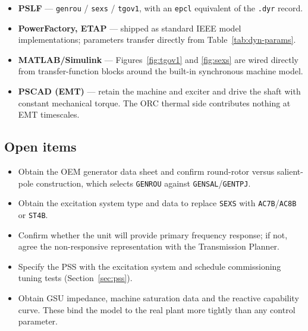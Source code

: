 \begin{itemize}\setlength{\itemsep}{0.25em}
  \item \textbf{PSLF} --- \texttt{genrou} / \texttt{sexs} / \texttt{tgov1},
        with an \texttt{epcl} equivalent of the \texttt{.dyr} record.
  \item \textbf{PowerFactory, ETAP} --- shipped as standard IEEE model
        implementations; parameters transfer directly from
        Table~\ref{tab:dyn-params}.
  \item \textbf{MATLAB/Simulink} --- Figures~\ref{fig:tgov1} and
        \ref{fig:sexs} are wired directly from transfer-function blocks around
        the built-in synchronous machine model.
  \item \textbf{PSCAD (EMT)} --- retain the machine and exciter and drive the
        shaft with constant mechanical torque. The ORC thermal side contributes
        nothing at EMT timescales.
\end{itemize}

\subsection{Open items}
\begin{itemize}\setlength{\itemsep}{0.25em}
  \item Obtain the OEM generator data sheet and confirm round-rotor versus
        salient-pole construction, which selects \texttt{GENROU} against
        \texttt{GENSAL}/\texttt{GENTPJ}.
  \item Obtain the excitation system type and data to replace \texttt{SEXS}
        with \texttt{AC7B}/\texttt{AC8B} or \texttt{ST4B}.
  \item Confirm whether the unit will provide primary frequency response; if
        not, agree the non-responsive representation with the Transmission
        Planner.
  \item Specify the PSS with the excitation system and schedule commissioning
        tuning tests (Section~\ref{sec:pss}).
  \item Obtain GSU impedance, machine saturation data and the reactive
        capability curve. These bind the model to the real plant more tightly
        than any control parameter.
\end{itemize}
